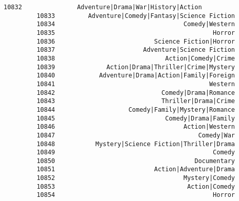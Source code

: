 \documentclass[11pt]{article}
\begin{document}
\begin{Verbatim}[commandchars=\\\{\}]
         10832               Adventure|Drama|War|History|Action   
         10833         Adventure|Comedy|Fantasy|Science Fiction   
         10834                                   Comedy|Western   
         10835                                           Horror   
         10836                           Science Fiction|Horror   
         10837                        Adventure|Science Fiction   
         10838                              Action|Comedy|Crime   
         10839              Action|Drama|Thriller|Crime|Mystery   
         10840            Adventure|Drama|Action|Family|Foreign   
         10841                                          Western   
         10842                             Comedy|Drama|Romance   
         10843                             Thriller|Drama|Crime   
         10844                    Comedy|Family|Mystery|Romance   
         10845                              Comedy|Drama|Family   
         10846                                   Action|Western   
         10847                                       Comedy|War   
         10848           Mystery|Science Fiction|Thriller|Drama   
         10849                                           Comedy   
         10850                                      Documentary   
         10851                           Action|Adventure|Drama   
         10852                                   Mystery|Comedy   
         10853                                    Action|Comedy   
         10854                                           Horror   
         

\end{Verbatim}
\end{document}

